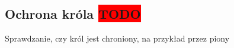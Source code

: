\subsection{Ochrona króla \colorbox{red}{TODO}}
\label{subsec:ochrona-krola}

{
    \color{red}
    \large Sprawdzanie, czy król jest chroniony, na przykład przez piony
}